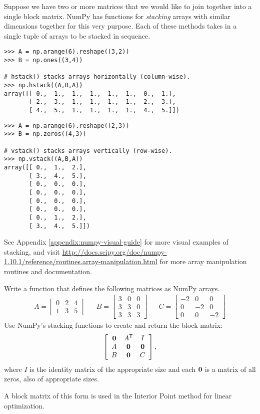 Suppose we have two or more matrices that we would like to join together into a single block matrix.
NumPy has functions for \emph{stacking} arrays with similar dimensions together for this very purpose.
Each of these methods takes in a single tuple of arrays to be stacked in sequence.

\begin{lstlisting}
>>> A = np.arange(6).reshape((3,2))
>>> B = np.ones((3,4))

# hstack() stacks arrays horizontally (column-wise).
>>> np.hstack((A,B,A))
array([[ 0.,  1.,  1.,  1.,  1.,  1.,  0.,  1.],
       [ 2.,  3.,  1.,  1.,  1.,  1.,  2.,  3.],
       [ 4.,  5.,  1.,  1.,  1.,  1.,  4.,  5.]])
\end{lstlisting}

\begin{lstlisting}
>>> A = np.arange(6).reshape((2,3))
>>> B = np.zeros((4,3))

# vstack() stacks arrays vertically (row-wise).
>>> np.vstack((A,B,A))
array([[ 0.,  1.,  2.],
       [ 3.,  4.,  5.],
       [ 0.,  0.,  0.],
       [ 0.,  0.,  0.],
       [ 0.,  0.,  0.],
       [ 0.,  0.,  0.],
       [ 0.,  1.,  2.],
       [ 3.,  4.,  5.]])
\end{lstlisting}

See Appendix \ref{appendix:numpy-visual-guide} for more visual examples of stacking, and visit \url{http://docs.scipy.org/doc/numpy-1.10.1/reference/routines.array-manipulation.html} for more array manipulation routines and documentation.

\begin{problem} %
Write a function that defines the following matrices as NumPy arrays.
\begin{align*}
A = \left[\begin{array}{rrr}
0 & 2 & 4\\
1 & 3 & 5\end{array}\right]
&&
B = \left[\begin{array}{rrr}
3 & 0 & 0\\
3 & 3 & 0\\
3 & 3 & 3\end{array}\right]
&&
C = \left[\begin{array}{rrr}
-2 & 0 & 0\\
0 & -2 & 0\\
0 & 0 & -2\end{array}\right]
\end{align*}
Use NumPy's stacking functions to create and return the block matrix:
\begin{align*}
\left[\begin{array}{ccc}
\mathbf{0} & A^{\mathsf T} & I\\
A & \mathbf{0} & \mathbf{0} \\
B & \mathbf{0} & C \end{array}\right],
\end{align*}
where $I$ is the identity matrix of the appropriate size and each $\mathbf{0}$ is a matrix of all zeros, also of appropriate sizes.

A block matrix of this form is used in the Interior Point method for linear optimization.
\label{prob:simple3}
\end{problem}

